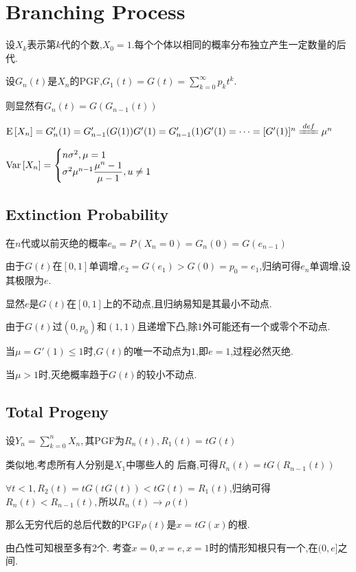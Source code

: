 \section{Branching Process}
设$ X_k$表示第$ k$代的个数,$ X_0=1.$每个个体以相同的概率分布独立产生一定数量的后代.

设$ G_n(t)$是$ X_n$的PGF,$ G_1(t) = G(t) = \sum_{k=0}^\infty{p_k}t^k$.

则显然有$ G_n(t) = G(G_{n-1}(t))$

$ \E{X_n} = G'_n(1) = G'_{n-1}(G(1))G'(1) = G'_{n-1}(1)G'(1) = \cdots =[G'(1)]^n \xlongequal{def}\mu^n$

$ \text{Var}\left[X_n\right] = \begin{cases} n\sigma^2 , \mu=1 \\ \sigma^2\mu^{n-1}\dfrac{\mu^n-1}{\mu-1}, u\neq 1\end{cases}$

\subsection{Extinction Probability}
在$ n$代或以前灭绝的概率$ e_n = P(X_n = 0) = G_n(0) = G(e_{n-1})$

由于$ G(t)$在$ [0,1]$单调增,$ e_2 = G(e_1) > G(0) = p_0 = e_1$,归纳可得$ e_n$单调增,设其极限为$ e$.

显然$ e$是$ G(t)$在$ [0,1]$上的不动点,且归纳易知是其最小不动点.

由于$ G(t)$过$ (0,p_0)$和$ (1,1)$且递增下凸,除$ 1$外可能还有一个或零个不动点.

当$ \mu = G'(1) \le 1$时,$ G(t)$的唯一不动点为$ 1$,即$ e = 1$,过程必然灭绝.

当$ \mu >1$时,灭绝概率趋于$ G(t)$的较小不动点.

\subsection{Total Progeny}
设$ Y_n = \sum_{k=0}^n{X_n},$其PGF为$ R_n(t), R_1(t) = tG(t)$

类似地,考虑所有人分别是$ X_1$中哪些人的 后裔,可得$ R_n(t) = tG(R_{n-1}(t))$

$ \forall t < 1, R_2(t) = tG(tG(t)) < tG(t) = R_1(t)$,归纳可得$ R_n(t)< R_{n-1}(t),$所以$ R_n(t)\to \rho(t)$

那么无穷代后的总后代数的PGF$ \rho(t)$是$ x = tG(x) $的根.

由凸性可知根至多有2个. 考查$ x=0, x=e, x=1$时的情形知根只有一个,在$ (0,e]$之间.

